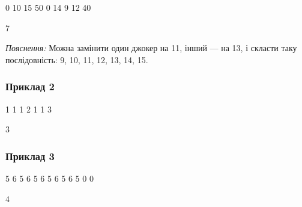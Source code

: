 \documentclass[12pt,a4paper]{article}
\begin{document}
\textbf{}

\begin{codeblock}
0 10 15 50 0 14 9 12 40
\end{codeblock}

\textbf{}

\begin{codeblock}
7
\end{codeblock}
\emph{Пояснення:} Можна замінити один джокер на 11, інший --- на 13, і скласти таку послідовність: 9, 10, 11, 12, 13, 14, 15.


\subsubsection*{Приклад 2}

\textbf{}

\begin{codeblock}
1 1 1 2 1 1 3
\end{codeblock}

\textbf{}

\begin{codeblock}
3
\end{codeblock}


\subsubsection*{Приклад 3}

\textbf{}

\begin{codeblock}
5 6 5 6 5 6 5 6 5 6 5 0 0
\end{codeblock}

\textbf{}

\begin{codeblock}
4
\end{codeblock}
\end{document}
